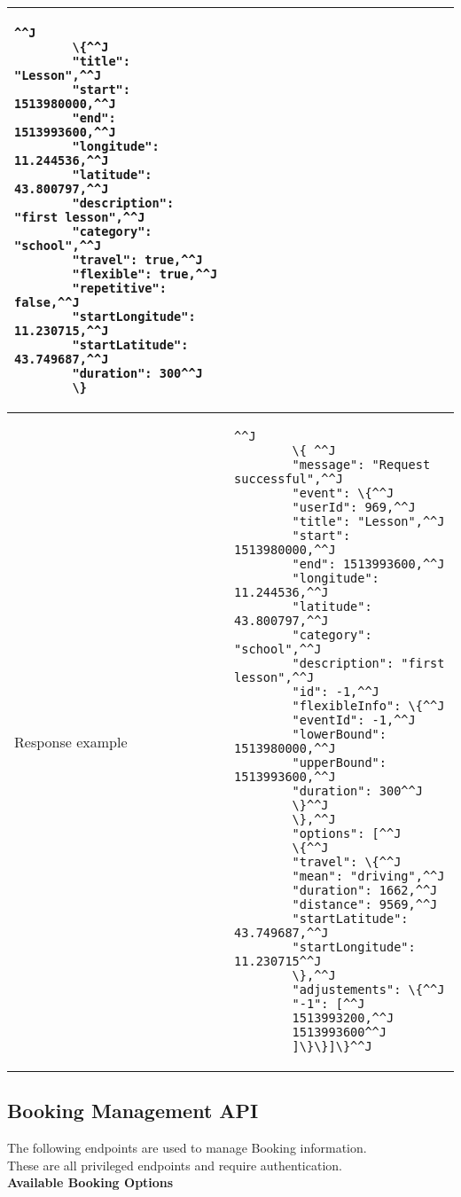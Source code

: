 \begin{tabularx}{\linewidth}{| l | l |}
{		\begin{lstlisting}^^J
		\{^^J
		"title": "Lesson",^^J
		"start": 1513980000,^^J
		"end": 1513993600,^^J
		"longitude": 11.244536,^^J
		"latitude": 43.800797,^^J
		"description": "first lesson",^^J
		"category": "school",^^J
		"travel": true,^^J
		"flexible": true,^^J
		"repetitive": false,^^J
		"startLongitude": 11.230715,^^J
		"startLatitude": 43.749687,^^J
		"duration": 300^^J
		\}
		\end{lstlisting}
	}  \\
	\hline
	Response example & 
	\parbox{0.8\textwidth}{
		\bigskip
		\begin{lstlisting}^^J
		\{ ^^J
		"message": "Request successful",^^J
		"event": \{^^J
		"userId": 969,^^J
		"title": "Lesson",^^J
		"start": 1513980000,^^J
		"end": 1513993600,^^J
		"longitude": 11.244536,^^J
		"latitude": 43.800797,^^J
		"category": "school",^^J
		"description": "first lesson",^^J
		"id": -1,^^J
		"flexibleInfo": \{^^J
		"eventId": -1,^^J
		"lowerBound": 1513980000,^^J
		"upperBound": 1513993600,^^J
		"duration": 300^^J
		\}^^J
		\},^^J
		"options": [^^J
		\{^^J
		"travel": \{^^J
		"mean": "driving",^^J
		"duration": 1662,^^J
		"distance": 9569,^^J
		"startLatitude": 43.749687,^^J
		"startLongitude": 11.230715^^J
		\},^^J
		"adjustements": \{^^J
		"-1": [^^J
		1513993200,^^J
		1513993600^^J
		]\}\}]\}^^J
		\end{lstlisting}
	}\\
	\hline
\end{tabularx}
\newpage
\subsection{Booking Management API}

The following endpoints are used to manage Booking information.\\
These are all privileged endpoints and require authentication.\\

\textbf{Available Booking Options}

